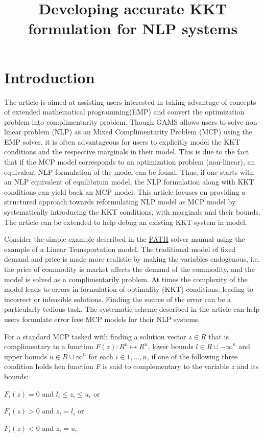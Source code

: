 \documentclass{article}
\title{Developing accurate KKT formulation for NLP systems}
\begin{document}
\section{Introduction}

The article is aimed at assisting users interested in taking advantage of concepts of extended mathematical programming(EMP) and convert the optimization problem into
complimentarity problem. Though GAMS allows users to solve non-linear problem (NLP) as an Mixed Complimentarity Problem (MCP) using the EMP solver, it is often
advantageous for users to explicitly model the KKT conditions and the respective marginals in their model. This is due to the fact that if the MCP model corresponds to
an optimization problem (non-linear), an equivalent NLP formulation of the model can be found. Thus, if one starts with an NLP equivalent of equilibrium model, the NLP
formulation along with KKT conditions can yield back an MCP model. This article focuses on providing a structured approach
towards reformulating NLP model as MCP model by systematically introducing the KKT conditions, with marginals and their bounds.
The article can be extended to help debug an existing KKT system in model.


Consider the simple example described in the \href{https://www.gams.com/latest/docs/S_PATH.html}{PATH} solver manual using the example of a Linear Transportation model.
The traditional model of fixed demand and price is made more realistic by making the variables endogenous, i.e. the price of commodity is market affects the demand of the
commodity, and the model is solved as a complimentarily problem.  At times the complexity of the model leads to errors in formulation of optimality (KKT) conditions,
leading to incorrect or infeasible solutions. Finding the source of the error can be a particularly tedious task. The systematic scheme described in the article can
help users formulate error free MCP models for their NLP systems.

For a standard MCP tasked with finding a solution vector  $z \in \!R$ that is complimentary to a function $F(z) : {\!R}^n \mapsto {\!R}^n$,
lower bounds $ l \in { \!R \cup {-\infty}}^n$ and upper bounds $ u \in { \!R \cup {\infty}}^n$ for each $ i \in {1,...,n}$, if one of the following three
condition holds hen function $F$ is said to complementary to the variable $z$ and its bounds:

 \centerline{$F_{i}(z) = 0$  and  $ l_i \leq z_i \leq u_i $   or}
 \centerline{$F_{i}(z) > 0$  and  $ z_i = l_i$  or }
 \centerline{ $F_{i}(z) < 0$  and  $ z_i = u_i$ }
\end{document}
